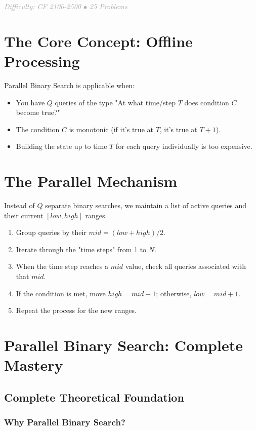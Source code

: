 \documentclass[11pt,a4paper,oneside]{book}
\begin{document}
\begin{center}
\textit{\textcolor{darkgray}{Difficulty: CF 2100-2500 $\bullet$ 25 Problems}}
\end{center}

\section{The Core Concept: Offline Processing}
Parallel Binary Search is applicable when:
\begin{itemize}
    \item You have $Q$ queries of the type "At what time/step $T$ does condition $C$ become true?"
    \item The condition $C$ is monotonic (if it's true at $T$, it's true at $T+1$).
    \item Building the state up to time $T$ for each query individually is too expensive.
\end{itemize}

\section{The Parallel Mechanism}
Instead of $Q$ separate binary searches, we maintain a list of active queries and their current $[low, high]$ ranges.
\begin{enumerate}
    \item Group queries by their $mid = (low + high) / 2$.
    \item Iterate through the "time steps" from 1 to $N$.
    \item When the time step reaches a $mid$ value, check all queries associated with that $mid$.
    \item If the condition is met, move $high = mid - 1$; otherwise, $low = mid + 1$.
    \item Repeat the process for the new ranges.
\end{enumerate}

\section{Parallel Binary Search: Complete Mastery}

\subsection{Complete Theoretical Foundation}

\subsubsection{Why Parallel Binary Search?}
\end{document}
